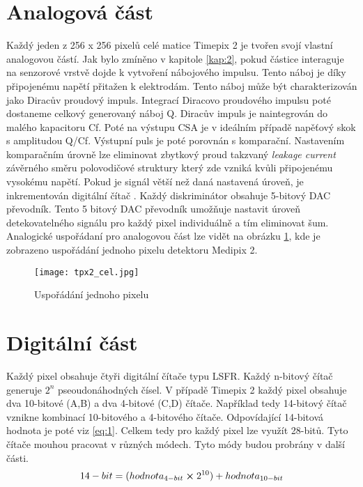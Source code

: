 
\section{Analogová část}
Každý jeden z 256 x 256 pixelů celé matice Timepix 2 je tvořen svojí vlastní analogovou částí. Jak bylo zmíněno v kapitole \ref{kap:2}, pokud částice interaguje na senzorové vrstvě dojde k vytvoření nábojového impulsu. Tento náboj je díky připojenému napětí přitažen k elektrodám. Tento náboj může být charakterizován jako Diracův proudový impuls. Integrací Diracovo proudového impulsu poté dostaneme celkový generovaný náboj Q. Diracův impuls je naintegrován do malého kapacitoru Cf. Poté na výstupu CSA je v ideálním případě napěťový skok s amplitudou Q/Cf. Výstupní puls je poté porovnán s komparační. Nastavením komparačním úrovně lze eliminovat zbytkový proud takzvaný \textit{leakage current} závěrného směru polovodičové struktury který zde vzniká kvůli připojenému vysokému napětí. Pokud je signál větší než daná nastavená úroveň, je inkrementován digitální čítač \cite{Llopart}. Každý diskriminátor obsahuje 5-bitový DAC převodník. Tento 5 bitový DAC převodník umožňuje nastavit úroveň detekovatelného signálu pro každý pixel individuálně a tím eliminovat šum. Analogické uspořádaní pro analogovou část lze vidět na obrázku \ref{fig:tpx2_cel}, kde je zobrazeno uspořádání jednoho pixelu detektoru Medipix 2.
\begin{figure}[h!]
	\centering
	\captionsetup{justification=centering}
	\texttt{[image: tpx2\_cel.jpg]}
	\caption{Uspořádání jednoho pixelu} 
	\label{fig:tpx2_cel}
\end{figure}	

\section{Digitální část}
Každý pixel obsahuje čtyři digitální čítače typu LSFR. Každý n-bitový čítač generuje $2^n$ pseoudonáhodných čísel. V případě Timepix 2 každý pixel obsahuje dva 10-bitové (A,B) a dva 4-bitové (C,D) čítače. Například tedy 14-bitový čítač vznikne kombinací 10-bitového a 4-bitového čítače. Odpovídající 14-bitová hodnota je poté viz \ref{eq:1}. Celkem tedy pro každý pixel lze využít 28-bitů. Tyto čítače mouhou pracovat v různých módech. Tyto módy budou probrány v další části.
\begin{equation}
	14-bit = (hodnota_{4-bit} \cross 2^{10}) + hodnota_{10-bit}
	\label{eq:1}
\end{equation}


